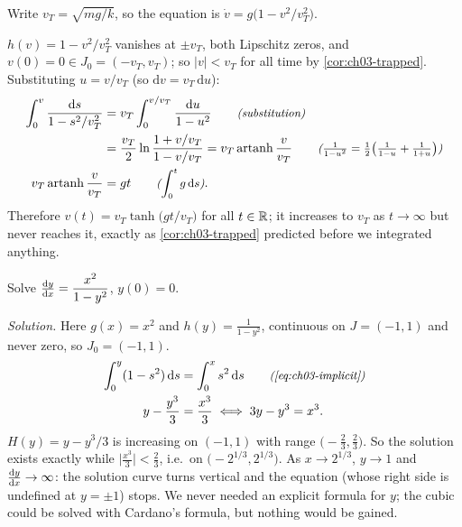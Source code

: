 \begin{example}\label{ex:ch03-drag}
 Write $v_T = \sqrt{mg/k}$, so the
equation is $\dot v = g\bigl(1 - v^2/v_T^2\bigr)$.

 $h(v) = 1 - v^2/v_T^2$ vanishes at $\pm v_T$,
both Lipschitz zeros, and $v(0) = 0\in J_0 = (-v_T, v_T)$; so
$|v|<v_T$ for all time by \cref{cor:ch03-trapped}. Substituting
$u = v/v_T$ (so $\mathrm{d}v = v_T\,\mathrm{d}u$):
\begin{align*}
  \int_0^{v}\frac{\mathrm{d}s}{1 - s^2/v_T^2}
  &= v_T\int_0^{v/v_T}\frac{\mathrm{d}u}{1 - u^2} \qquad\text{\small\itshape(substitution)}\\
  &= \frac{v_T}{2}\ln\frac{1 + v/v_T}{1 - v/v_T} = v_T\operatorname{artanh}\frac{v}{v_T}
     \qquad\text{\small\itshape($\tfrac{1}{1-u^2} = \tfrac12\bigl(\tfrac1{1-u} + \tfrac1{1+u}\bigr)$)}\\
  v_T\operatorname{artanh}\frac{v}{v_T} &= gt \qquad\text{\small\itshape($\int_0^t g\,\mathrm{d}s$)}.
\end{align*}
Therefore $v(t) = v_T\tanh\bigl(gt/v_T\bigr)$ for all $t\in\mathbb{R}$; it increases to
$v_T$ as $t\to\infty$ but never reaches it, exactly as
\cref{cor:ch03-trapped} predicted before we integrated anything.
\end{example}

\begin{example}\label{ex:ch03-implicit}
Solve $\frac{\mathrm{d}y}{\mathrm{d}x} = \dfrac{x^2}{1 - y^2}$, $y(0) = 0$.

\emph{Solution.} Here $g(x) = x^2$ and $h(y) = \frac{1}{1-y^2}$, continuous on
$J = (-1,1)$ and never zero, so $J_0 = (-1,1)$.
\begin{align*}
  \int_0^y(1 - s^2)\,\mathrm{d}s &= \int_0^x s^2\,\mathrm{d}s \qquad\text{\small\itshape(\eqref{eq:ch03-implicit})}\\
  y - \frac{y^3}{3} &= \frac{x^3}{3}
     \;\Longleftrightarrow\; 3y - y^3 = x^3 .
\end{align*}
$H(y) = y - y^3/3$ is increasing on $(-1,1)$ with range
$\bigl(-\frac23,\frac23\bigr)$. So the solution exists exactly while
$\bigl|\frac{x^3}{3}\bigr|<\frac23$, i.e.\ on $\bigl(-2^{1/3},2^{1/3}\bigr)$. As
$x\to 2^{1/3}$, $y\to 1$ and $\frac{\mathrm{d}y}{\mathrm{d}x}\to\infty$: the solution curve turns
vertical and the equation (whose right side is undefined at $y=\pm1$) stops.
We never needed an explicit formula for $y$; the cubic could be solved with
Cardano's formula, but nothing would be gained.
\end{example}

